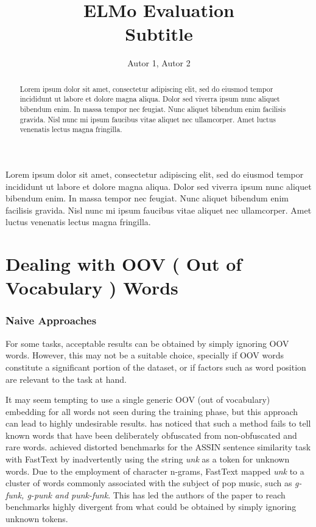 \documentclass[12pt]{article}
\title{ELMo Evaluation\\ Subtitle}
\author{Autor 1\inst{1}, Autor 2\inst{2} }
\begin{document}
 

\maketitle

\begin{abstract}
  Lorem ipsum dolor sit amet, consectetur adipiscing elit, sed do eiusmod tempor incididunt ut labore et dolore magna aliqua. Dolor sed viverra ipsum nunc aliquet bibendum enim. In massa tempor nec feugiat. Nunc aliquet bibendum enim facilisis gravida. Nisl nunc mi ipsum faucibus vitae aliquet nec ullamcorper. Amet luctus venenatis lectus magna fringilla. 
\end{abstract}
     
\begin{resumo} 
  Lorem ipsum dolor sit amet, consectetur adipiscing elit, sed do eiusmod tempor incididunt ut labore et dolore magna aliqua. Dolor sed viverra ipsum nunc aliquet bibendum enim. In massa tempor nec feugiat. Nunc aliquet bibendum enim facilisis gravida. Nisl nunc mi ipsum faucibus vitae aliquet nec ullamcorper. Amet luctus venenatis lectus magna fringilla. 
\end{resumo}

\section{Dealing with OOV ( Out of Vocabulary ) Words}  

\subsubsection{Naive Approaches}

For some tasks, acceptable results can be obtained by simply ignoring OOV words. However, this may not be a suitable choice, specially if OOV words constitute a significant portion of the dataset, or if factors such as word position are relevant to the task at hand.

It may seem tempting to use a single generic OOV (out of vocabulary) embedding for all words not seen during the training phase, but this approach can lead to highly undesirable results. \cite{} has noticed that such a method fails to tell known words that have been deliberately obfuscated from non-obfuscated and rare words. \cite{hartmann2017portuguese} achieved distorted benchmarks for the ASSIN sentence similarity task with FastText by inadvertently using the string \textit{unk} as a token for unknown words. Due to the employment of character n-grams, FastText mapped \textit{unk} to a cluster of words commonly associated with the subject of pop music, such as \textit{g-funk, g-punk and punk-funk}. This has led the authors of the paper to reach benchmarks highly divergent from what could be obtained by simply ignoring unknown tokens.
\end{document}
